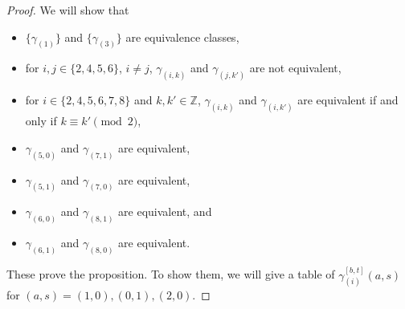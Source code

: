 \documentclass[12pt]{amsart}
\theoremstyle{definition}
\newcommand{\Z}{\mathbb{Z}}
\begin{document}
\begin{proof}
  We will show that
  \begin{itemize}
    \item $\{\gamma_{(1)}\}$ and $\{\gamma_{(3)}\}$
    are equivalence classes,
    \item for $i, j\in\{2,4,5,6\}$, $i\ne j$, $\gamma_{(i,k)}$
    and $\gamma_{(j,k')}$ are not equivalent,
    \item for $i\in \{2,4,5,6, 7, 8\}$ and $k, k'\in \Z$,
    $\gamma_{(i,k)}$ and $\gamma_{(i,k')}$ are equivalent
    if and only if $k\equiv k'\pmod{2}$, 
    \item $\gamma_{(5,0)}$ and $\gamma_{(7,1)}$ are equivalent, 
    \item $\gamma_{(5,1)}$ and $\gamma_{(7,0)}$ are equivalent,
    \item $\gamma_{(6,0)}$ and $\gamma_{(8,1)}$ are equivalent, and
    \item $\gamma_{(6,1)}$ and $\gamma_{(8,0)}$ are equivalent.
  \end{itemize}
  These prove the proposition.
  To show them, we will give a table of
  $\gamma_{(i)}^{[b,t]}(a,s)$ for $(a,s)=(1,0), (0,1), (2,0)$.


\end{proof}
\end{document}
